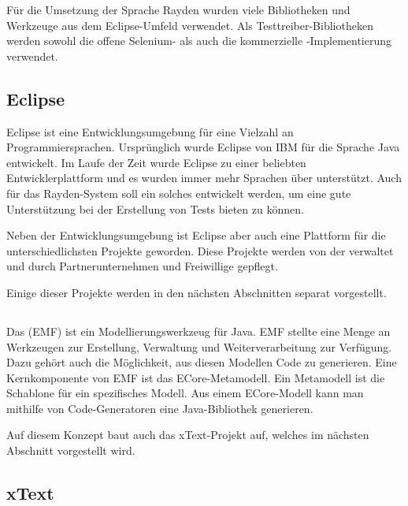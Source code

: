 \SuperPar
Für die Umsetzung der Sprache Rayden wurden viele Bibliotheken und Werkzeuge aus dem Eclipse-Umfeld verwendet. Als Testtreiber-Bibliotheken werden sowohl die offene Selenium- als auch die kommerzielle -Implementierung verwendet.

\subsection{Eclipse}

Eclipse \cite{Eclipse} ist eine Entwicklungsumgebung für eine Vielzahl an Programmiersprachen. Ursprünglich wurde Eclipse von IBM für die Sprache Java entwickelt. Im Laufe der Zeit wurde Eclipse zu einer beliebten Entwicklerplattform und es wurden immer mehr Sprachen über  unterstützt. Auch für das Rayden-System soll ein solches  entwickelt werden, um eine gute Unterstützung bei der Erstellung von Tests bieten zu können. 

\SuperPar
Neben der Entwicklungsumgebung ist Eclipse aber auch eine Plattform für die unterschiedlichsten Projekte geworden. Diese Projekte werden von der  \cite{EclipseFoundation} verwaltet und durch Partnerunternehmen und Freiwillige gepflegt. 

\SuperPar
Einige dieser Projekte werden in den nächsten Abschnitten separat vorgestellt.

\subsection{}

Das  (EMF) \cite{EMF} ist ein Modellierungswerkzeug für Java. EMF stellte eine Menge an Werkzeugen zur Erstellung, Verwaltung und Weiterverarbeitung zur Verfügung. Dazu gehört auch die Möglichkeit, aus diesen Modellen Code zu generieren. Eine Kernkomponente von EMF ist das ECore-Metamodell. Ein Metamodell ist die Schablone für ein spezifisches Modell. Aus einem ECore-Modell kann man mithilfe von Code-Generatoren eine Java-Bibliothek generieren.

\SuperPar
Auf diesem Konzept baut auch das xText-Projekt auf, welches im nächsten Abschnitt vorgestellt wird. 

\subsection{xText}

